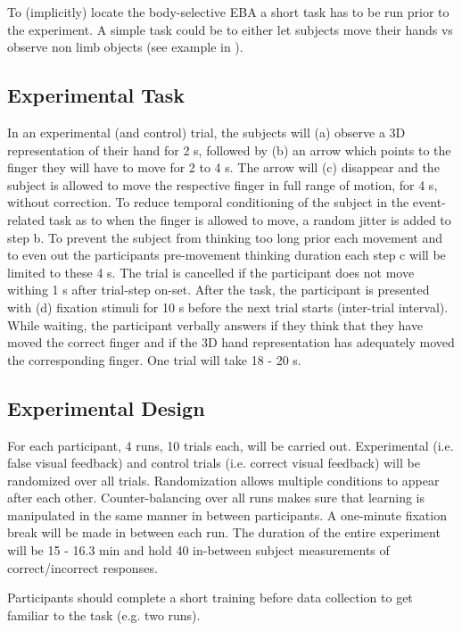 \documentclass[man]{apa7}
\begin{document}
To (implicitly) locate the body-selective EBA a short task has to be run prior to the experiment. A simple task could be to either let subjects move their hands vs observe non limb objects (see example in \cite{Limanowski2016}).

\subsection{Experimental Task}

In an experimental (and control) trial, the subjects will (a) observe a 3D representation of their hand for 2 s, followed by (b) an arrow which points to the finger they will have to move for 2 to 4 s. The arrow will (c) disappear and the subject is allowed to move the respective finger in full range of motion, for 4 s, without correction. To reduce temporal conditioning of the subject in the event-related task as to when the finger is allowed to move, a random jitter is added to step b. To prevent the subject from thinking too long prior each movement and to even out the participants pre-movement thinking duration each step c will be limited to these 4 s. The trial is cancelled if the participant does not move withing 1 s after trial-step on-set. After the task, the participant is presented with (d) fixation stimuli for 10 s before the next trial starts (inter-trial interval). While waiting, the participant verbally answers if they think that they have moved the correct finger and if the 3D hand representation has adequately moved the corresponding finger. One trial will take 18 - 20 s.

\subsection{Experimental Design}

For each participant, 4 runs, 10 trials each, will be carried out. Experimental (i.e. false visual feedback) and control trials (i.e. correct visual feedback) will be randomized over all trials. Randomization allows multiple conditions to appear after each other. Counter-balancing over all runs makes sure that learning is manipulated in the same manner in between participants. A one-minute fixation break will be made in between each run. The duration of the entire experiment will be 15 - 16.3 min and hold 40 in-between subject measurements of correct/incorrect responses.

Participants should complete a short training before data collection to get familiar to the task (e.g. two runs).
\end{document}
